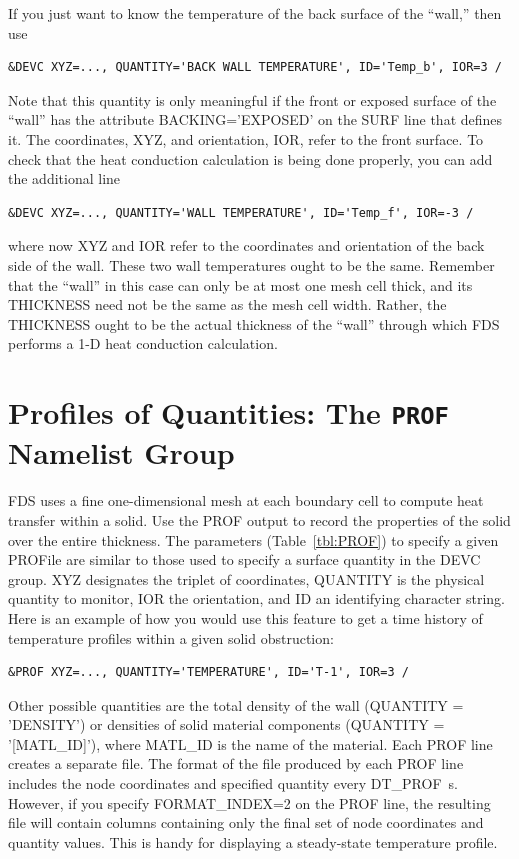 \documentclass[11pt]{book}
\begin{document}
If you just want to know the temperature of the back surface of the ``wall,'' then use
\begin{lstlisting}
&DEVC XYZ=..., QUANTITY='BACK WALL TEMPERATURE', ID='Temp_b', IOR=3 /
\end{lstlisting}
Note that this quantity is only meaningful if the front or exposed surface of the ``wall'' has the attribute {\ct BACKING='EXPOSED'} on the {\ct SURF} line that defines it. The coordinates, {\ct XYZ}, and orientation, {\ct IOR}, refer to the front surface. To check that the heat conduction calculation is being done properly, you can add the additional line
\begin{lstlisting}
&DEVC XYZ=..., QUANTITY='WALL TEMPERATURE', ID='Temp_f', IOR=-3 /
\end{lstlisting}
where now {\ct XYZ} and {\ct IOR} refer to the coordinates and orientation of the back side of the wall. These two wall temperatures ought to be the same. Remember that the ``wall'' in this case can only be at most one mesh cell thick, and its {\ct THICKNESS} need not be the same as the mesh cell width. Rather, the {\ct THICKNESS} ought to be the actual thickness of the ``wall'' through which FDS performs a 1-D heat conduction calculation.


\section{Profiles of Quantities: The \texorpdfstring{{\tt PROF}}{PROF} Namelist Group}
\label{info:PROF}

FDS uses a fine one-dimensional mesh at each boundary cell to compute heat transfer within a solid. Use the {\ct PROF} output to record the properties of the solid over the entire thickness. The parameters (Table~\ref{tbl:PROF}) to specify a given {\ct PROF}ile are similar to those used to specify a surface quantity in the {\ct DEVC} group. {\ct XYZ} designates the triplet of coordinates, {\ct QUANTITY} is the physical quantity to monitor, {\ct IOR} the orientation, and {\ct ID} an identifying character string. Here is an example of how you would use this feature to get a time history of temperature profiles within a given solid obstruction:

\begin{lstlisting}
&PROF XYZ=..., QUANTITY='TEMPERATURE', ID='T-1', IOR=3 /
\end{lstlisting}

\noindent
Other possible quantities are the total density of the wall ({\ct QUANTITY = 'DENSITY'}) or densities of solid material components
({\ct QUANTITY = '[MATL\_ID]'}), where {\ct MATL\_ID} is the name of the material. Each {\ct PROF} line creates a separate file. The format of the file produced by each {\ct PROF} line includes the node coordinates and specified quantity every {\ct DT\_PROF}~s. However, if you specify {\ct FORMAT\_INDEX=2} on the {\ct PROF} line, the resulting file will contain columns containing only the final set of node coordinates and quantity values. This is handy for displaying a steady-state temperature profile.
\end{document}
